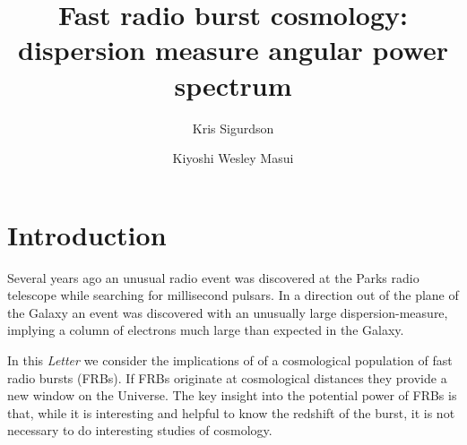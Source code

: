 \documentclass[onecolumn,prd,noshowpacs,nofootinbib,amsmath,amssymb]{revtex4}
\begin{document}
\title{Fast radio burst cosmology: dispersion measure angular power spectrum}

\author{Kris Sigurdson}

\author{Kiyoshi Wesley Masui}

\begin{abstract}

\end{abstract}

\maketitle


\section{Introduction}

Several years ago an unusual radio event was discovered at the Parks radio telescope while searching for millisecond pulsars.  In a direction out of the plane of the Galaxy an event was discovered with an unusually large dispersion-measure, implying a column of electrons much large than expected in the Galaxy.

In this \emph{ Letter} we consider the implications of of a cosmological population of fast radio bursts (FRBs). 
If FRBs originate at cosmological distances they provide a new window on the Universe. The key insight into the potential power of FRBs is that, while it is interesting and helpful to know the redshift of the burst, it is not necessary to do interesting studies of cosmology.
\end{document}
